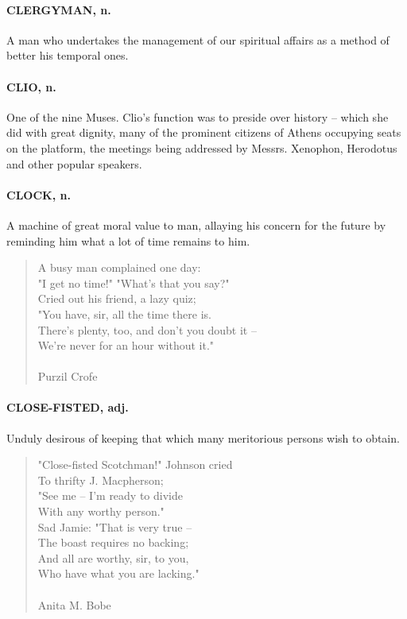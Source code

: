 \documentclass[11pt]{article}
\begin{document}
\paragraph{CLERGYMAN, n.}  A man who undertakes the management of our spiritual
affairs as a method of better his temporal ones.

\paragraph{CLIO, n.}  One of the nine Muses.  Clio's function was to preside over
history -- which she did with great dignity, many of the prominent
citizens of Athens occupying seats on the platform, the meetings being
addressed by Messrs. Xenophon, Herodotus and other popular speakers.

\paragraph{CLOCK, n.}  A machine of great moral value to man, allaying his concern
for the future by reminding him what a lot of time remains to him.

\begin{quote}   A busy man complained one day: \\
  "I get no time!"  "What's that you say?" \\
  Cried out his friend, a lazy quiz; \\
  "You have, sir, all the time there is. \\
  There's plenty, too, and don't you doubt it -- \\
  We're never for an hour without it." \\
 \\
Purzil Crofe \end{quote}


\paragraph{CLOSE-FISTED, adj.}  Unduly desirous of keeping that which many
meritorious persons wish to obtain.

\begin{quote}   "Close-fisted Scotchman!" Johnson cried \\
      To thrifty J. Macpherson; \\
  "See me -- I'm ready to divide \\
      With any worthy person." \\
  Sad Jamie:  "That is very true -- \\
      The boast requires no backing; \\
  And all are worthy, sir, to you, \\
      Who have what you are lacking." \\
 \\
Anita M. Bobe \end{quote}
\end{document}
